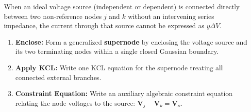 \documentclass[12pt,a4paper]{article}
\begin{document}
\begin{tcolorbox}[defbox, title={\textbf{Supernode Technique (Voltage Sources Between Non-Reference Nodes)}}]
When an ideal voltage source (independent or dependent) is connected directly between two non-reference nodes $j$ and $k$ without an intervening series impedance, the current through that source cannot be expressed as $y\Delta V$. 
\begin{enumerate}[leftmargin=*, itemsep=2pt, topsep=1pt]
  \item \textbf{Enclose:} Form a generalized \textbf{supernode} by enclosing the voltage source and its two terminating nodes within a single closed Gaussian boundary.
  \item \textbf{Apply KCL:} Write one KCL equation for the supernode treating all connected external branches.
  \item \textbf{Constraint Equation:} Write an auxiliary algebraic constraint equation relating the node voltages to the source: $\mathbf{V}_j - \mathbf{V}_k = \mathbf{V}_s$.
\end{enumerate}
\end{tcolorbox}
\end{document}
